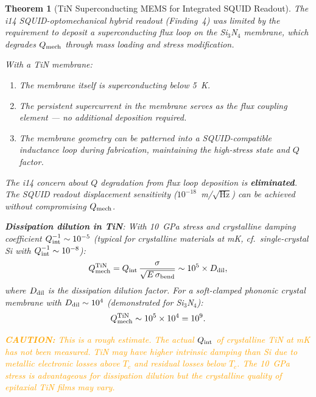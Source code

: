 \documentclass[11pt]{article}
\newcommand{\Qmech}{Q_{\rm mech}}
\newcommand{\caution}[1]{\textcolor{orange}{\textbf{CAUTION:} #1}}
\newtheorem{theorem}{Theorem}[section]
\theoremstyle{definition}
\theoremstyle{remark}
\begin{document}
\begin{theorem}[TiN Superconducting MEMS for Integrated SQUID Readout]
\label{thm:TiN}
The i14 SQUID-optomechanical hybrid readout (Finding~4) was limited
by the requirement to deposit a superconducting flux loop on the
Si$_3$N$_4$ membrane, which degrades $\Qmech$ through mass loading
and stress modification.

With a TiN membrane:
\begin{enumerate}[nosep]
\item The membrane \emph{itself} is superconducting below 5~K.
\item The persistent supercurrent in the membrane serves as the
  flux coupling element --- no additional deposition required.
\item The membrane geometry can be patterned into a SQUID-compatible
  inductance loop during fabrication, maintaining the high-stress
  state and $Q$ factor.
\end{enumerate}

The i14 concern about $Q$ degradation from flux loop deposition
is \textbf{eliminated}. The SQUID readout displacement sensitivity
($10^{-18}$~m/$\sqrt{\text{Hz}}$) can be achieved without
compromising $\Qmech$.

\textbf{Dissipation dilution in TiN}: With 10~GPa stress and
crystalline damping coefficient $Q_{\rm int}^{-1} \sim 10^{-5}$
(typical for crystalline materials at mK, cf.\ single-crystal
Si with $Q_{\rm int}^{-1} \sim 10^{-8}$):
\begin{equation}
\Qmech^{\rm TiN} = Q_{\rm int}\,\frac{\sigma}{\sqrt{E\,\sigma_{\rm bend}}}
\sim 10^5 \times D_{\rm dil},
\end{equation}
where $D_{\rm dil}$ is the dissipation dilution factor. For a
soft-clamped phononic crystal membrane with $D_{\rm dil} \sim 10^4$
(demonstrated for Si$_3$N$_4$):
\begin{equation}
\Qmech^{\rm TiN} \sim 10^5 \times 10^4 = 10^9.
\end{equation}

\caution{This is a rough estimate. The actual $Q_{\rm int}$ of
crystalline TiN at mK has not been measured. TiN may have higher
intrinsic damping than Si due to metallic electronic losses above
$T_c$ and residual losses below $T_c$. The 10~GPa stress is
advantageous for dissipation dilution but the crystalline quality
of epitaxial TiN films may vary.}
\end{theorem}
\end{document}
